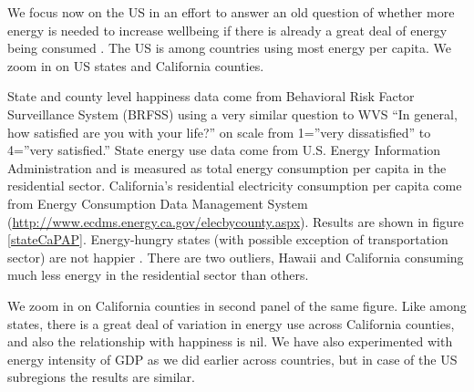 \documentclass[10pt, letterpaper]{article}
\begin{document}
\begin{spacing}{1.4}
We  focus now on the US in an effort to answer
an old question of whether more energy is needed to increase wellbeing if there
is already a great deal of energy being consumed \cite{mazur74}. The US is among
countries using most energy per capita.
%
 We zoom in on US states and California counties.

State and county level happiness data come from Behavioral Risk Factor
Surveillance System (BRFSS) using a very similar question to WVS ``In general,
how satisfied are you with your life?'' on scale 
from 1=''very dissatisfied'' to 4=''very satisfied.'' State energy use data come from
U.S. Energy Information Administration and is measured as  total energy
consumption per capita in the residential sector.  
California's  residential electricity consumption per capita come from 
Energy Consumption Data Management System
(\url{http://www.ecdms.energy.ca.gov/elecbycounty.aspx}). Results are shown in
figure \ref{stateCaPAP}. Energy-hungry states (with possible exception of transportation sector) are not happier%
. There are two outliers, Hawaii and California consuming much less energy in
the residential sector than others. 

We zoom in on California counties in
second panel of the same figure. Like among states, there is a great deal of variation in energy
use across California counties, and also the 
relationship with happiness is nil. 
We have also experimented with energy intensity of
GDP as we did earlier across countries, but in case of the US subregions the results are
similar. %


\end{spacing}
\end{document}
